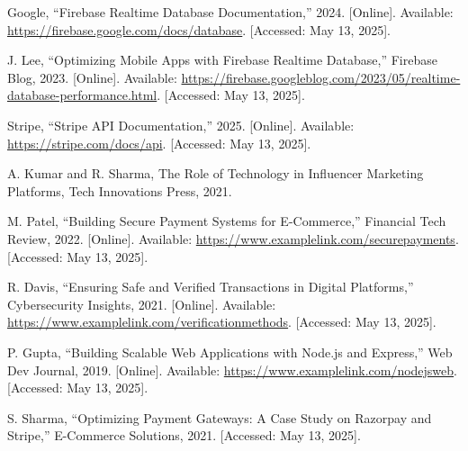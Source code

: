 %
\begin{thebibliography}{99}
Google, “Firebase Realtime Database Documentation,” 2024. [Online]. Available: \url{https://firebase.google.com/docs/database}. [Accessed: May 13, 2025].

J. Lee, “Optimizing Mobile Apps with Firebase Realtime Database,” Firebase Blog, 2023. [Online]. Available: \url{https://firebase.googleblog.com/2023/05/realtime-database-performance.html}. [Accessed: May 13, 2025].

Stripe, “Stripe API Documentation,” 2025. [Online]. Available: \url{https://stripe.com/docs/api}. [Accessed: May 13, 2025].

A. Kumar and R. Sharma, The Role of Technology in Influencer Marketing Platforms, Tech Innovations Press, 2021.

M. Patel, “Building Secure Payment Systems for E-Commerce,” Financial Tech Review, 2022. [Online]. Available: \url{https://www.examplelink.com/securepayments}. [Accessed: May 13, 2025].

R. Davis, “Ensuring Safe and Verified Transactions in Digital Platforms,” Cybersecurity Insights, 2021. [Online]. Available: \url{https://www.examplelink.com/verificationmethods}. [Accessed: May 13, 2025].

P. Gupta, “Building Scalable Web Applications with Node.js and Express,” Web Dev Journal, 2019. [Online]. Available: \url{https://www.examplelink.com/nodejsweb}. [Accessed: May 13, 2025].

S. Sharma, “Optimizing Payment Gateways: A Case Study on Razorpay and Stripe,” E-Commerce Solutions, 2021. [Accessed: May 13, 2025].

\end{thebibliography}
